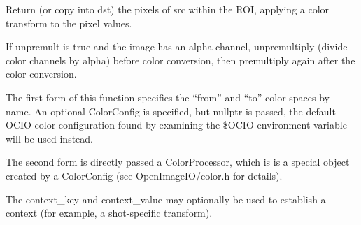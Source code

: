  
Return (or copy into {\cf dst}) the pixels of {\cf src} within the ROI,
applying a color transform to the pixel values.

If {\cf unpremult} is {\cf true} and the image has an alpha channel,
unpremultiply (divide color channels by alpha) before color conversion, then
premultiply again after the color conversion.

The first form of this function specifies the ``from'' and ``to'' color
spaces by name. An optional {\cf ColorConfig} is specified, but {\cf nullptr}
is passed, the default OCIO color configuration found by examining the {\cf
\$OCIO} environment variable will be used instead.

The second form is directly passed a {\cf ColorProcessor}, which is is a
special object created by a {\cf ColorConfig} (see {\cf OpenImageIO/color.h}
for details).

The {\cf context_key} and {\cf context_value} may optionally be used
to establish a context (for example, a shot-specific transform).

